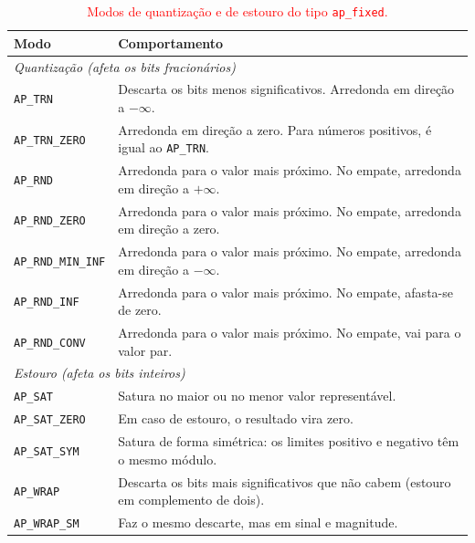 \begin{table}[htbp]
\caption{\textcolor{red}{Modos de quantização e de estouro do tipo \texttt{ap\_fixed}.}}
\label{tab:modos-apfixed}
\centering
\footnotesize
\begin{tabular}{p{2.6cm}p{11cm}}
\toprule
Modo & Comportamento \\
\midrule
\multicolumn{2}{l}{\textit{Quantização (afeta os bits fracionários)}} \\
\texttt{AP\_TRN}       & Descarta os bits menos significativos. Arredonda em direção a $-\infty$. \\
\texttt{AP\_TRN\_ZERO} & Arredonda em direção a zero. Para números positivos, é igual ao \texttt{AP\_TRN}. \\
\texttt{AP\_RND}       & Arredonda para o valor mais próximo. No empate, arredonda em direção a $+\infty$. \\
\texttt{AP\_RND\_ZERO} & Arredonda para o valor mais próximo. No empate, arredonda em direção a zero. \\
\texttt{AP\_RND\_MIN\_INF} & Arredonda para o valor mais próximo. No empate, arredonda em direção a $-\infty$. \\
\texttt{AP\_RND\_INF}  & Arredonda para o valor mais próximo. No empate, afasta-se de zero. \\
\texttt{AP\_RND\_CONV} & Arredonda para o valor mais próximo. No empate, vai para o valor par. \\
\midrule
\multicolumn{2}{l}{\textit{Estouro (afeta os bits inteiros)}} \\
\texttt{AP\_SAT}       & Satura no maior ou no menor valor representável. \\
\texttt{AP\_SAT\_ZERO} & Em caso de estouro, o resultado vira zero. \\
\texttt{AP\_SAT\_SYM}  & Satura de forma simétrica: os limites positivo e negativo têm o mesmo módulo. \\
\texttt{AP\_WRAP}      & Descarta os bits mais significativos que não cabem (estouro em complemento de dois). \\
\texttt{AP\_WRAP\_SM}  & Faz o mesmo descarte, mas em sinal e magnitude. \\
\bottomrule
\end{tabular}
\legend{\textcolor{red}{Fonte: TODO (UG1399).}}
\end{table}


